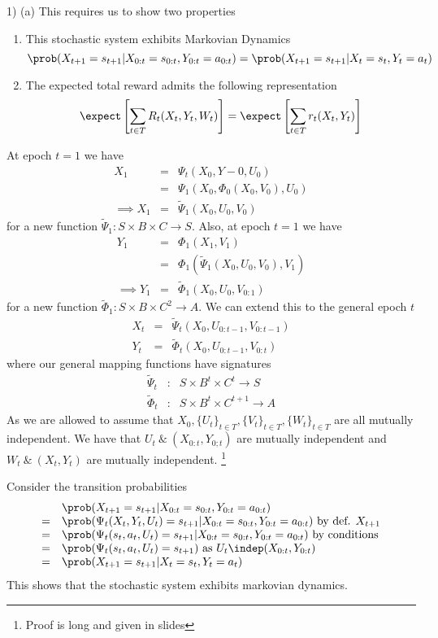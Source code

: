 \documentclass[11pt,a4paper]{article}
\begin{document}
\begin{answer}{1) (a)}
  This requires us to show two properties
  \begin{enumerate}
    \item This stochastic system exhibits Markovian Dynamics
    \[ \prob(X_{t+1}=s_{t+1}|X_{0:t}=s_{0:t},Y_{0:t}=a_{0:t})=\prob(X_{t+1}=s_{t+1}|X_t=s_t,Y_t=a_t) \]
    \item The expected total reward admits the following representation
    \[ \expect\left[\sum_{t\in T}R_t(X_t,Y_t,W_t)\right]=\expect\left[\sum_{t\in T}r_t(X_t,Y_t)\right] \]
  \end{enumerate}
  At epoch $t=1$ we have
  \[\begin{array}{rcl}
    X_1&=&\Psi_t(X_0,Y-0,U_0)\\
    &=&\Psi_1(X_0,\Phi_0(X_0,V_0),U_0)\\
    \implies X_1&=&\tilde\Psi_1(X_0,U_0,V_0)
  \end{array}\]
  for a new function $\tilde\Psi_1:S\times B\times C\to S$. Also, at epoch $t=1$ we have
  \[\begin{array}{rcl}
    Y_1&=&\Phi_1(X_1,V_1)\\
    &=&\Phi_1(\tilde\Psi_1(X_0,U_0,V_0),V_1)\\
    \implies Y_1&=&\tilde\Phi_1(X_0,U_0,V_{0:1})
  \end{array}\]
  for a new function $\tilde\Phi_1:S\times B\times C^2\to A$. We can extend this to the general epoch $t$
  \[\begin{array}{rcl}
    X_t&=&\tilde\Psi_t(X_0,U_{0:t-1},V_{0:t-1})\\
    Y_t&=&\tilde\Phi_t(X_0,U_{0:t-1},V_{0:t})
  \end{array}\]
  where our general mapping functions have signatures
  \[\begin{array}{rcl}
    \tilde\Psi_t&:&S\times B^t\times C^t\to S\\
    \tilde\Phi_t&:&S\times B^t\times C^{t+1}\to A
  \end{array}\]
  As we are allowed to assume that $X_0,\{U_t\}_{t\in T},\{V_t\}_{t\in T},\{W_t\}_{t\in T}$ are all mutually independent. We have that $U_t\ \&\ (X_{0:t},Y_{0;t})$ are mutually independent and $W_t\ \&\ (X_t,Y_t)$ are mutually independent. \footnote{Proof is long and given in slides}
  \par Consider the transition probabilities
  \[\begin{array}{rl}
    &\prob(X_{t+1}=s_{t+1}|X_{0:t}=s_{0:t},Y_{0:t}=a_{0:t})\\
    =&\prob(\Psi_t(X_t,Y_t,U_t)=s_{t+1}|X_{0:t}=s_{0:t},Y_{0:t}=a_{0:t})\text{ by def. }X_{t+1}\\
    =&\prob(\Psi_t(s_t,a_t,U_t)=s_{t+1}|X_{0:t}=s_{0:t},Y_{0:t}=a_{0:t})\text{ by conditions}\\
    =&\prob(\Psi_t(s_t,a_t,U_t)=s_{t+1})\text{ as }U_t\indep(X_{0:t},Y_{0:t})\\
    =&\prob(X_{t+1}=s_{t+1}|X_t=s_t,Y_t=a_t)
  \end{array}\]
  This shows that the stochastic system exhibits markovian dynamics.
\end{answer}
\end{document}
